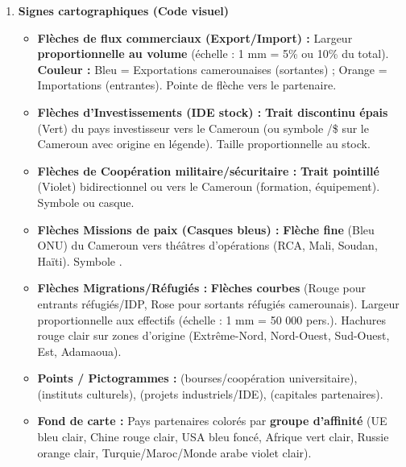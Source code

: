 \documentclass[11pt]{article}
\begin{document}
\begin{corrige}
\begin{enumerate}
    \item \textbf{Signes cartographiques (Code visuel)}
    \begin{itemize}
        \item \textbf{Flèches de flux commerciaux (Export/Import) :} Largeur \textbf{proportionnelle au volume} (échelle : 1 mm = 5\% ou 10\% du total). \textbf{Couleur :} \textcolor{popblue}{Bleu} = Exportations camerounaises (sortantes) ; \textcolor{poporange}{Orange} = Importations (entrantes). Pointe de flèche vers le partenaire.
        \item \textbf{Flèches d'Investissements (IDE stock) :} \textbf{Trait discontinu épais} (\textcolor{popgreen}{Vert}) du pays investisseur vers le Cameroun (ou symbole \texteuro/\$ sur le Cameroun avec origine en légende). Taille proportionnelle au stock.
        \item \textbf{Flèches de Coopération militaire/sécuritaire :} \textbf{Trait pointillé} (\textcolor{poppurple}{Violet}) bidirectionnel ou vers le Cameroun (formation, équipement). Symbole ou casque.
        \item \textbf{Flèches Missions de paix (Casques bleus) :} \textbf{Flèche fine} (\textcolor{popblue}{Bleu ONU}) du Cameroun vers théâtres d'opérations (RCA, Mali, Soudan, Haïti). Symbole .
        \item \textbf{Flèches Migrations/Réfugiés :} \textbf{Flèches courbes} (\textcolor{popred}{Rouge} pour entrants réfugiés/IDP, \textcolor{poppink}{Rose} pour sortants réfugiés camerounais). Largeur proportionnelle aux effectifs (échelle : 1 mm = 50 000 pers.). Hachures \textcolor{popred!30}{rouge clair} sur zones d'origine (Extrême-Nord, Nord-Ouest, Sud-Ouest, Est, Adamaoua).
        \item \textbf{Points / Pictogrammes :} (bourses/coopération universitaire), (instituts culturels), (projets industriels/IDE), (capitales partenaires).
        \item \textbf{Fond de carte :} Pays partenaires colorés par \textbf{groupe d'affinité} (UE \textcolor{popblueL}{bleu clair}, Chine \textcolor{popredL}{rouge clair}, USA \textcolor{popblue}{bleu foncé}, Afrique \textcolor{popgreenL}{vert clair}, Russie \textcolor{poporangeL}{orange clair}, Turquie/Maroc/Monde arabe \textcolor{poppurpleL}{violet clair}).
    \end{itemize}

\end{enumerate}
\end{corrige}
\end{document}
